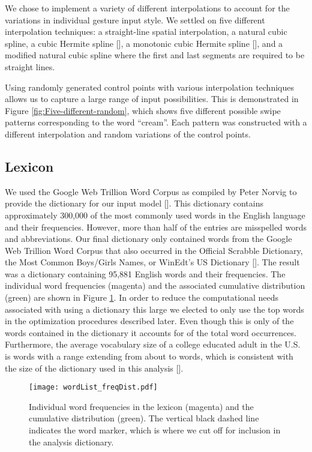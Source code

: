 \documentclass[final,1p,times,authoryear]{elsarticle}
\begin{document}
We chose to implement a variety of different interpolations to account
for the variations in individual gesture input style. We settled on five
different interpolation techniques: a straight-line spatial interpolation,
a natural cubic spline, a cubic Hermite spline [\cite{Splines}], a monotonic cubic
Hermite spline [\cite{MonotonicSplines}], and a modified natural cubic spline where the first
and last segments are required to be straight lines.

Using randomly generated control points with various interpolation
techniques allows us to capture a large range of input possibilities.
This is demonstrated in Figure \ref{fig:Five-different-random}, which
shows five different possible swipe patterns corresponding to the
word ``cream''. Each pattern was constructed with a different interpolation
and random variations of the control points.


\subsection{Lexicon\label{sub:Word-Corpus}}
We used the Google Web Trillion Word Corpus as compiled by Peter Norvig
to provide the dictionary for our input model [\cite{Norvig:Misc}].
This dictionary contains approximately 300,000 of the most commonly
used words in the English language and their frequencies. However,
more than half of the entries are misspelled words and abbreviations.
Our final dictionary only contained words from the Google Web Trillion
Word Corpus that also occurred in the Official Scrabble Dictionary,
the Most Common Boys/Girls Names, or WinEdt\textquoteright s US Dictionary
[\cite{Scrabble:Ward,WinEdit:Wordlist}]. The result was a dictionary
containing 95,881 English words and their frequencies. The individual
word frequencies (magenta) and the associated cumulative distribution
(green) are shown in Figure \ref{fig:Individual-word-frequencies}.
In order to reduce the computational needs associated with using a
dictionary this large we elected to only use the top  words
in the optimization procedures described later. Even though this is
only  of the words contained in the dictionary it accounts
for  of the total word occurrences. Furthermore, the average
vocabulary size of a college educated adult in the U.S. is 
words with a range extending from about  to  words,
which is consistent with the size of the dictionary used in this analysis [\cite{GOULDEN1990}].

\begin{figure}[tp!]
\begin{centering}
\texttt{[image: wordList\_freqDist.pdf]}
\par\end{centering}
\smallskip{}
\protect\caption{Individual word frequencies in the lexicon (magenta) and the cumulative
distribution (green). The vertical black dashed line indicates the
 word marker, which is where we cut off for inclusion in
the analysis dictionary.\label{fig:Individual-word-frequencies}}
\end{figure}
\end{document}
